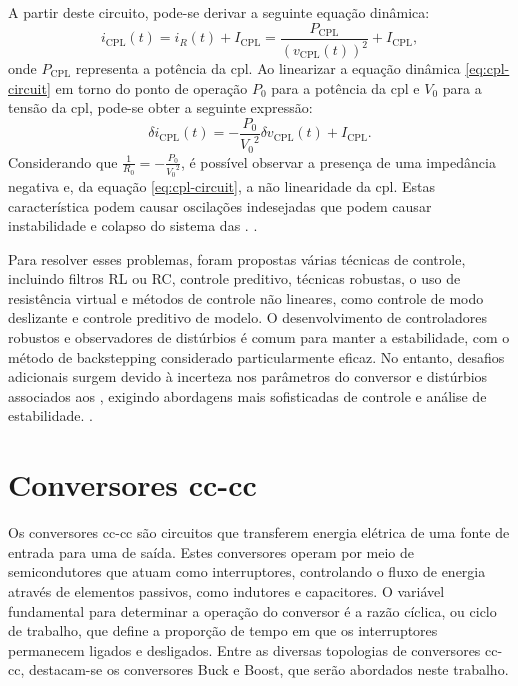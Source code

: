 \noindent A partir deste circuito, pode-se derivar a seguinte equação dinâmica: \begin{equation} i_{\text{CPL}}(t) = i_R(t) + I_{\text{CPL}} = \frac{P_{\text{CPL}}}{(v_{\text{CPL}}(t))^2} + I_{\text{CPL}} \label{eq:cpl-circuit},\end{equation} onde $P_{\text{CPL}}$ representa a potência da \acrshort{cpl}. Ao linearizar a equação dinâmica \eqref{eq:cpl-circuit} em torno do ponto de operação $P_0$ para a potência da \acrshort{cpl} e $V_0$ para a tensão da \acrshort{cpl}, pode-se obter a seguinte expressão: \begin{equation} \delta i_{\text{CPL}}(t) = - \frac{P_0}{{V_0}^2}\delta v_{\text{CPL}}(t) + I_{\text{CPL}}. \end{equation} Considerando que $\frac{1}{R_0} = - \frac{P_0}{{V_0}^2}$, é possível observar a presença de uma impedância negativa e, da equação \eqref{eq:cpl-circuit}, a não linearidade da \acrshort{cpl}. Estas característica podem causar oscilações indesejadas que podem causar instabilidade e colapso do sistema das . \cite{Bessa2020, Amiri2020}.

Para resolver esses problemas, foram propostas várias técnicas de controle, incluindo filtros RL ou RC, controle preditivo, técnicas robustas, o uso de resistência virtual e métodos de controle não lineares, como controle de modo deslizante e controle preditivo de modelo. O desenvolvimento de controladores robustos e observadores de distúrbios é comum para manter a estabilidade, com o método de backstepping considerado particularmente eficaz. No entanto, desafios adicionais surgem devido à incerteza nos parâmetros do conversor e distúrbios associados aos , exigindo abordagens mais sofisticadas de controle e análise de estabilidade. \cite{Bessa2020, Amiri2020}.

\section{Conversores \acrshort{cc}-\acrshort{cc}}

Os conversores \acrshort{cc}-\acrshort{cc} são circuitos que transferem energia elétrica de uma fonte de entrada para uma de saída. Estes conversores operam por meio de semicondutores que atuam como interruptores, controlando o fluxo de energia através de elementos passivos, como indutores e capacitores. O variável fundamental para determinar a operação do conversor é a razão cíclica, ou ciclo de trabalho, que define a proporção de tempo em que os interruptores permanecem ligados e desligados. Entre as diversas topologias de conversores \acrshort{cc}-\acrshort{cc}, destacam-se os conversores Buck e Boost, que serão abordados neste trabalho.

